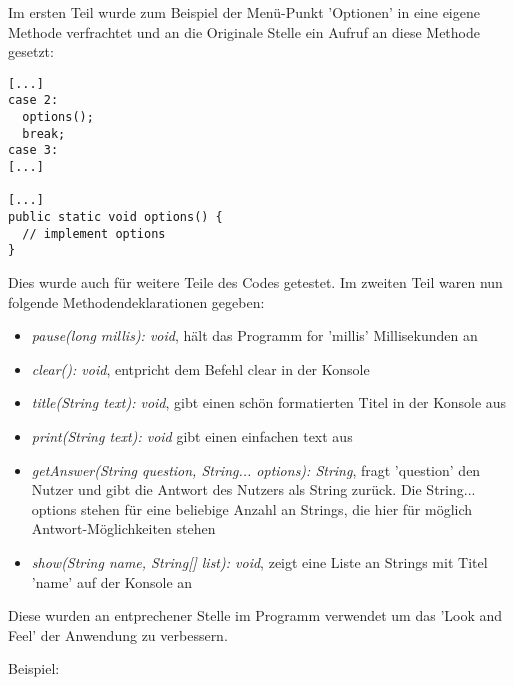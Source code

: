 Im ersten Teil wurde zum Beispiel der Menü-Punkt 'Optionen' in eine eigene Methode verfrachtet und an die Originale Stelle ein Aufruf an diese Methode gesetzt:

\begin{verbatim}
[...]
case 2:
  options();
  break;
case 3:
[...]

[...]
public static void options() {
  // implement options
}
\end{verbatim}

Dies wurde auch für weitere Teile des Codes getestet. Im zweiten Teil waren nun folgende Methodendeklarationen gegeben: 
\begin{itemize}
	\item \textit{pause(long millis): void}, hält das Programm for 'millis' Millisekunden an
	\item \textit{clear(): void}, entpricht dem Befehl clear in der Konsole 
	\item \textit{title(String text): void}, gibt einen schön formatierten Titel in der Konsole aus
	\item \textit{print(String text): void} gibt einen einfachen text aus
	\item \textit{getAnswer(String question, String... options): String}, fragt 'question' den Nutzer und gibt die Antwort des Nutzers als String zurück. Die String... options stehen für eine beliebige Anzahl an Strings, die hier für möglich Antwort-Möglichkeiten stehen
	\item \textit{show(String name, String[] list): void}, zeigt eine Liste an Strings mit Titel 'name' auf der Konsole an
\end{itemize}

Diese wurden an entprechener Stelle im Programm verwendet um das 'Look and Feel' der Anwendung zu verbessern. 

Beispiel:

